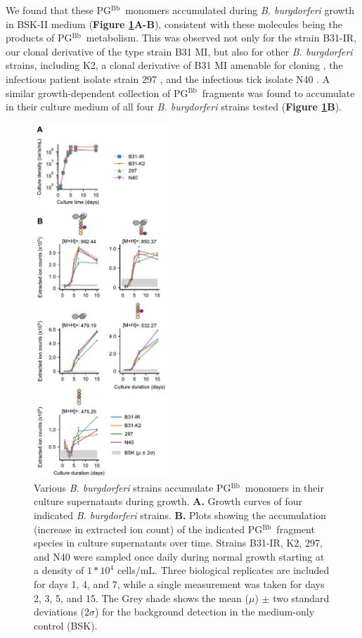 \documentclass[twoside, watermark]{zHenriquesLab-StyleBioRxiv}
\newcommand{\tmu}{$\mu$} %
\newcommand{\pgbb}{PG$^\text{Bb}$}
\begin{document}
\vspace{1mm}
We found that these \pgbb~monomers accumulated during \textit{B. burgdorferi} growth in BSK-II medium (\textbf{Figure \ref{fig: fig2}A-B}), consistent with these molecules being the products of \pgbb~metabolism. This was observed not only for the strain B31-IR, our clonal derivative of the type strain B31 MI, but also for other \textit{B. burgdorferi} strains, including K2, a clonal derivative of B31 MI amenable for cloning \cite{Fraser1997,Rego2011}, the infectious patient isolate strain 297 \cite{Steere1983}, and the infectious tick isolate N40 \cite{Barthold1988}. A similar growth-dependent collection of \pgbb~fragments was found to accumulate in their culture medium of all four \textit{B. burgdorferi} strains tested (\textbf{Figure \ref{fig: fig2}B}).

\begin{figure}[tbhp]
    \includegraphics[width=0.45\textwidth]{Figures/Figure_2_Shedding_in_different_strains.pdf}
    \caption{Various \textit{B. burgdorferi} strains accumulate \pgbb~monomers in their culture supernatants during growth. \textbf{A.}  Growth curves of four indicated \textit{B. burgdorferi} strains. \textbf{B.} Plots showing the accumulation (increase in extracted ion count) of the indicated \pgbb~fragment species in culture supernatants over time. Strains B31-IR, K2, 297, and N40 were sampled once daily during normal growth starting at a density of $1*10^4$ cells/mL. Three biological replicates are included for days 1, 4, and 7, while a single measurement was taken for days 2, 3, 5, and 15. The Grey shade shows the mean (\tmu) $\pm$ two standard deviations (2$\sigma$) for the background detection in the medium-only control (BSK).}
    \label{fig: fig2}
\end{figure}
\end{document}

